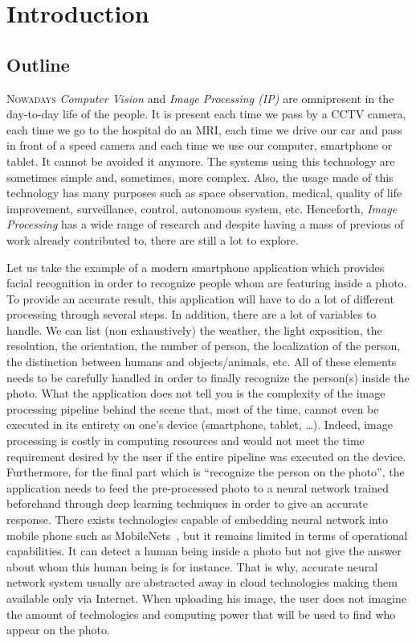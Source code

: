 \chapter{Introduction}
\label{chap:introduction}

\section*{Outline}

\lettrine[lines=2]{N}{owadays} \emph{Computer Vision} and \emph{Image Processing (IP)} are omnipresent in the day-to-day
life of the people. It is present each time we pass by a CCTV camera, each time we go to the hospital do an MRI, each
time we drive our car and pass in front of a speed camera and each time we use our computer, smartphone or tablet. It
cannot be avoided it anymore. The systems using this technology are sometimes simple and, sometimes, more complex. Also,
the usage made of this technology has many purposes such as space observation, medical, quality of life improvement,
surveillance, control, autonomous system, etc. Henceforth, \emph{Image Processing} has a wide range of research and
despite having a mass of previous of work already contributed to, there are still a lot to explore.

Let us take the example of a modern smartphone application which provides facial recognition in order to recognize
people whom are featuring inside a photo. To provide an accurate result, this application will have to do a lot of
different processing through several steps. In addition, there are a lot of variables to handle. We can list (non
exhaustively) the weather, the light exposition, the resolution, the orientation, the number of person, the localization
of the person, the distinction between humans and objects/animals, etc. All of these elements needs to be carefully
handled in order to finally recognize the person(s) inside the photo. What the application does not tell you is the
complexity of the image processing pipeline behind the scene that, most of the time, cannot even be executed in its
entirety on one's device (smartphone, tablet, \ldots). Indeed, image processing is costly in computing resources and
would not meet the time requirement desired by the user if the entire pipeline was executed on the device. Furthermore,
for the final part which is ``recognize the person on the photo'', the application needs to feed the pre-processed photo
to a neural network trained beforehand through deep learning techniques in order to give an accurate response. There
exists technologies capable of embedding neural network into mobile phone such as
MobileNets~\parencite{howard.2017.mobilenets}, but it remains limited in terms of operational capabilities. It can
detect a human being inside a photo but not give the answer about whom this human being is for instance. That is why,
accurate neural network system usually are abstracted away in cloud technologies making them available only via
Internet. When uploading his image, the user does not imagine the amount of technologies and computing power that will
be used to find who appear on the photo.

